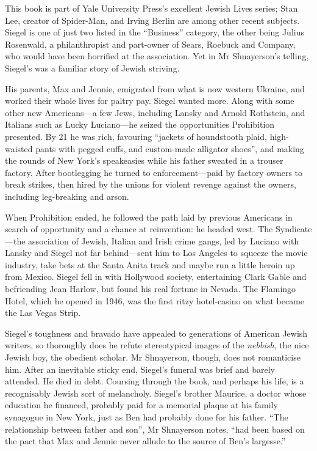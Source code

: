 \documentclass{article}
\begin{document}
This book is part of Yale University Press's excellent Jewish Lives series; Stan Lee, creator of Spider-Man, and Irving Berlin are among other recent subjects. Siegel is one of just two listed in the ``Business'' category, the other being Julius Rosenwald, a philanthropist and part-owner of Sears, Roebuck and Company, who would have been horrified at the association. Yet in Mr Shnayerson's telling, Siegel's was a familiar story of Jewish striving. 

His parents, Max and Jennie, emigrated from what is now western Ukraine, and worked their whole lives for paltry pay. Siegel wanted more. Along with some other new Americans---a few Jews, including Lansky and Arnold Rothstein, and Italians such as Lucky Luciano---he seized the opportunities Prohibition presented. By 21 he was rich, favouring ``jackets of houndstooth plaid, high-waisted pants with pegged cuffs, and custom-made alligator shoes'', and making the rounds of New York's speakeasies while his father sweated in a trouser factory. After bootlegging he turned to enforcement---paid by factory owners to break strikes, then hired by the unions for violent revenge against the owners, including leg-breaking and arson. 

When Prohibition ended, he followed the path laid by previous Americans in search of opportunity and a chance at reinvention: he headed west. The Syndicate---the association of Jewish, Italian and Irish crime gangs, led by Luciano with Lansky and Siegel not far behind---sent him to Los Angeles to squeeze the movie industry, take bets at the Santa Anita track and maybe run a little heroin up from Mexico. Siegel fell in with Hollywood society, entertaining Clark Gable and befriending Jean Harlow, but found his real fortune in Nevada. The Flamingo Hotel, which he opened in 1946, was the first ritzy hotel-casino on what became the Las Vegas Strip. 

Siegel's toughness and bravado have appealed to generations of American Jewish writers, so thoroughly does he refute stereotypical images of the \emph{nebbish}, the nice Jewish boy, the obedient scholar. Mr Shnayerson, though, does not romanticise him. After an inevitable sticky end, Siegel's funeral was brief and barely attended. He died in debt. Coursing through the book, and perhaps his life, is a recognisably Jewish sort of melancholy. Siegel's brother Maurice, a doctor whose education he financed, probably paid for a memorial plaque at his family synagogue in New York, just as Ben had probably done for his father. ``The relationship between father and son'', Mr Shnayerson notes, ``had been based on the pact that Max and Jennie never allude to the source of Ben's largesse.'' {} 
\end{document}
